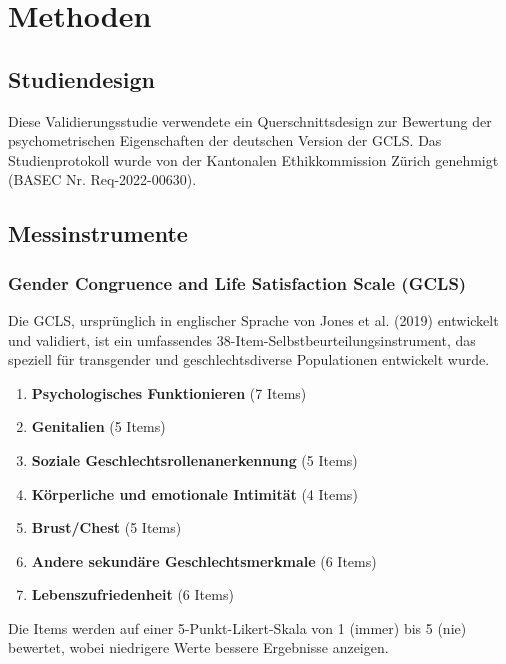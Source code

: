 \documentclass[11pt,a4paper]{article}
\begin{document}
\section{Methoden}

\subsection{Studiendesign}

Diese Validierungsstudie verwendete ein Querschnittsdesign zur Bewertung der psychometrischen Eigenschaften der deutschen Version der GCLS. Das Studienprotokoll wurde von der Kantonalen Ethikkommission Zürich genehmigt (BASEC Nr. Req-2022-00630).

\subsection{Messinstrumente}

\subsubsection{Gender Congruence and Life Satisfaction Scale (GCLS)}

Die GCLS, ursprünglich in englischer Sprache von Jones et al. (2019) entwickelt und validiert, ist ein umfassendes 38-Item-Selbstbeurteilungsinstrument, das speziell für transgender und geschlechtsdiverse Populationen entwickelt wurde.

\begin{tcolorbox}[colback=darkblue!5,colframe=darkblue,title=\textbf{GCLS Dimensionen},arc=2mm]
\begin{enumerate}
    \item \textbf{Psychologisches Funktionieren} (7 Items)
    \item \textbf{Genitalien} (5 Items) 
    \item \textbf{Soziale Geschlechtsrollenanerkennung} (5 Items)
    \item \textbf{Körperliche und emotionale Intimität} (4 Items)
    \item \textbf{Brust/Chest} (5 Items)
    \item \textbf{Andere sekundäre Geschlechtsmerkmale} (6 Items)
    \item \textbf{Lebenszufriedenheit} (6 Items)
\end{enumerate}
\end{tcolorbox}

Die Items werden auf einer 5-Punkt-Likert-Skala von 1 (immer) bis 5 (nie) bewertet, wobei niedrigere Werte bessere Ergebnisse anzeigen.
\end{document}
